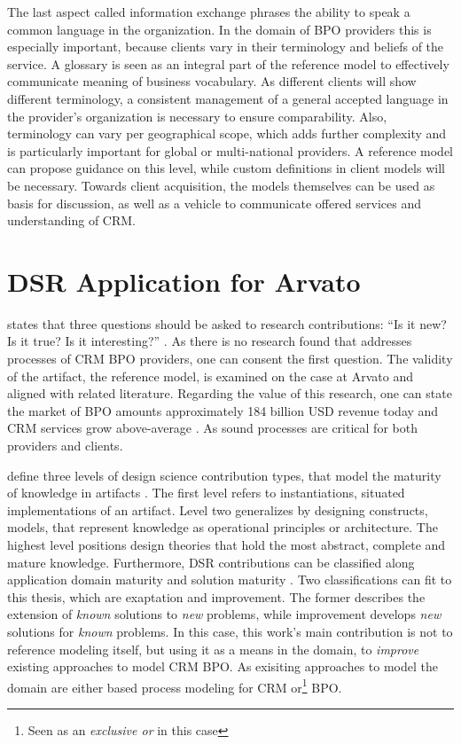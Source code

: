 The last aspect called information exchange phrases the ability to speak a common language in the organization. In the domain of BPO providers this is especially important, because clients vary in their terminology and beliefs of the service. A glossary is seen as an integral part of the reference model to effectively communicate meaning of business vocabulary. As different clients will show different terminology, a consistent management of a general accepted language in the provider’s organization is necessary to ensure comparability. Also, terminology can vary per geographical scope, which adds further complexity and is particularly important for global or multi-national providers. A reference model can propose guidance on this level, while custom definitions in client models will be necessary. Towards client acquisition, the models themselves can be used as basis for discussion, as well as a vehicle to communicate offered services and understanding of CRM.


%

\section{DSR Application for Arvato}

 \citeauthor{wilson2002responsible} states that three questions should be asked to research contributions: \enquote{Is it new? Is it true? Is it interesting?} \citep[]{wilson2002responsible}. As there is no research found that addresses processes of CRM BPO providers, one can consent the first question. The validity of the artifact, \viz the reference model, is examined on the case at Arvato and aligned with related literature. Regarding the value of this research, one can state the market of BPO amounts approximately 184 billion USD revenue today and CRM services grow above-average \citep{hfs2016top}. As sound processes are critical for both providers and clients. 

\citeauthor{gregor2013positioning} define three levels of design science contribution types, that model the maturity of knowledge in artifacts \citep{gregor2013positioning}. The first level refers to instantiations, \ie situated implementations of an artifact. Level two generalizes by designing constructs, models, that represent knowledge as operational principles or architecture. The highest level positions design theories that hold the most abstract, complete and mature knowledge. Furthermore, \acrshort{DSR} contributions can be classified along application domain maturity and solution maturity \citep{gregor2013positioning}. Two classifications can fit to this thesis, which are exaptation and improvement. The former describes the extension of \textit{known} solutions to \textit{new} problems, while improvement develops \textit{new} solutions for \textit{known} problems. In this case, this work's main contribution is not to reference modeling itself, but using it as a means in the domain, to \textit{improve} existing approaches to model CRM BPO. As exisiting approaches to model the domain are either based process modeling for CRM or\footnote{Seen as an \textit{exclusive or} in this case} BPO. 


